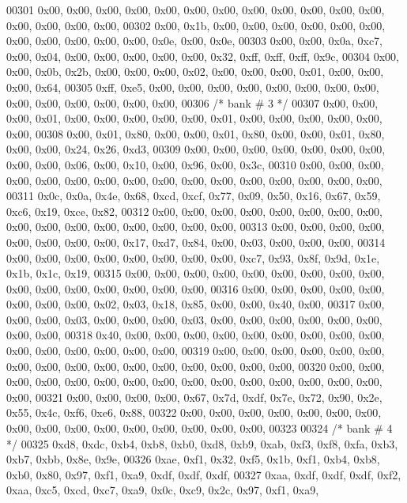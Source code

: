 \begin{DoxyCode}
00301     0x00, 0x00, 0x00, 0x00, 0x00, 0x00, 0x00, 0x00, 0x00, 0x00, 0x00, 0x00, 0x00, 0x00, 0x00, 0x00,
00302     0x00, 0x1b, 0x00, 0x00, 0x00, 0x00, 0x00, 0x00, 0x00, 0x00, 0x00, 0x00, 0x00, 0x0e, 0x00, 0x0e,
00303     0x00, 0x00, 0x0a, 0xc7, 0x00, 0x04, 0x00, 0x00, 0x00, 0x00, 0x00, 0x32, 0xff, 0xff, 0xff, 0x9c,
00304     0x00, 0x00, 0x0b, 0x2b, 0x00, 0x00, 0x00, 0x02, 0x00, 0x00, 0x00, 0x01, 0x00, 0x00, 0x00, 0x64,
00305     0xff, 0xe5, 0x00, 0x00, 0x00, 0x00, 0x00, 0x00, 0x00, 0x00, 0x00, 0x00, 0x00, 0x00, 0x00, 0x00,
00306     \textcolor{comment}{/* bank # 3 */}
00307     0x00, 0x00, 0x00, 0x01, 0x00, 0x00, 0x00, 0x00, 0x00, 0x01, 0x00, 0x00, 0x00, 0x00, 0x00, 0x00,
00308     0x00, 0x01, 0x80, 0x00, 0x00, 0x01, 0x80, 0x00, 0x00, 0x01, 0x80, 0x00, 0x00, 0x24, 0x26, 0xd3,
00309     0x00, 0x00, 0x00, 0x00, 0x00, 0x00, 0x00, 0x00, 0x00, 0x06, 0x00, 0x10, 0x00, 0x96, 0x00, 0x3c,
00310     0x00, 0x00, 0x00, 0x00, 0x00, 0x00, 0x00, 0x00, 0x00, 0x00, 0x00, 0x00, 0x00, 0x00, 0x00, 0x00,
00311     0x0c, 0x0a, 0x4e, 0x68, 0xcd, 0xcf, 0x77, 0x09, 0x50, 0x16, 0x67, 0x59, 0xc6, 0x19, 0xce, 0x82,
00312     0x00, 0x00, 0x00, 0x00, 0x00, 0x00, 0x00, 0x00, 0x00, 0x00, 0x00, 0x00, 0x00, 0x00, 0x00, 0x00,
00313     0x00, 0x00, 0x00, 0x00, 0x00, 0x00, 0x00, 0x00, 0x17, 0xd7, 0x84, 0x00, 0x03, 0x00, 0x00, 0x00,
00314     0x00, 0x00, 0x00, 0x00, 0x00, 0x00, 0x00, 0x00, 0xc7, 0x93, 0x8f, 0x9d, 0x1e, 0x1b, 0x1c, 0x19,
00315     0x00, 0x00, 0x00, 0x00, 0x00, 0x00, 0x00, 0x00, 0x00, 0x00, 0x00, 0x00, 0x00, 0x00, 0x00, 0x00,
00316     0x00, 0x00, 0x00, 0x00, 0x00, 0x00, 0x00, 0x00, 0x02, 0x03, 0x18, 0x85, 0x00, 0x00, 0x40, 0x00,
00317     0x00, 0x00, 0x00, 0x03, 0x00, 0x00, 0x00, 0x03, 0x00, 0x00, 0x00, 0x00, 0x00, 0x00, 0x00, 0x00,
00318     0x40, 0x00, 0x00, 0x00, 0x00, 0x00, 0x00, 0x00, 0x00, 0x00, 0x00, 0x00, 0x00, 0x00, 0x00, 0x00,
00319     0x00, 0x00, 0x00, 0x00, 0x00, 0x00, 0x00, 0x00, 0x00, 0x00, 0x00, 0x00, 0x00, 0x00, 0x00, 0x00,
00320     0x00, 0x00, 0x00, 0x00, 0x00, 0x00, 0x00, 0x00, 0x00, 0x00, 0x00, 0x00, 0x00, 0x00, 0x00, 0x00,
00321     0x00, 0x00, 0x00, 0x00, 0x67, 0x7d, 0xdf, 0x7e, 0x72, 0x90, 0x2e, 0x55, 0x4c, 0xf6, 0xe6, 0x88,
00322     0x00, 0x00, 0x00, 0x00, 0x00, 0x00, 0x00, 0x00, 0x00, 0x00, 0x00, 0x00, 0x00, 0x00, 0x00, 0x00,
00323 
00324     \textcolor{comment}{/* bank # 4 */}
00325     0xd8, 0xdc, 0xb4, 0xb8, 0xb0, 0xd8, 0xb9, 0xab, 0xf3, 0xf8, 0xfa, 0xb3, 0xb7, 0xbb, 0x8e, 0x9e,
00326     0xae, 0xf1, 0x32, 0xf5, 0x1b, 0xf1, 0xb4, 0xb8, 0xb0, 0x80, 0x97, 0xf1, 0xa9, 0xdf, 0xdf, 0xdf,
00327     0xaa, 0xdf, 0xdf, 0xdf, 0xf2, 0xaa, 0xc5, 0xcd, 0xc7, 0xa9, 0x0c, 0xc9, 0x2c, 0x97, 0xf1, 0xa9,

\end{DoxyCode}
